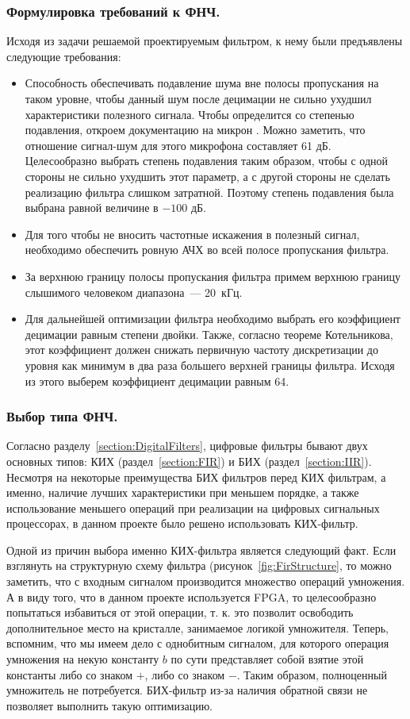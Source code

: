 \subsubsection{Формулировка требований к ФНЧ. }
Исходя из задачи решаемой проектируемым фильтром, к нему были предъявлены следующие требования:
\begin{itemize}
	\item Способность обеспечивать подавление шума вне полосы пропускания на таком уровне, чтобы данный шум после децимации не сильно ухудшил характеристики полезного сигнала. Чтобы определится со степенью подавления, откроем документацию на микрон \micname. Можно заметить, что отношение сигнал-шум для этого микрофона составляет 61 дБ. Целесообразно выбрать степень подавления таким образом, чтобы с одной стороны не сильно ухудшить этот параметр, а с другой стороны не сделать реализацию фильтра слишком затратной. Поэтому степень подавления была выбрана равной величине в $-100$ дБ.
	\item Для того чтобы не вносить частотные искажения в полезный сигнал, необходимо обеспечить ровную АЧХ во всей полосе пропускания фильтра.
	\item За верхнюю границу полосы пропускания фильтра примем верхнюю границу слышимого человеком диапазона~--- 20~кГц.
	\item Для дальнейшей оптимизации фильтра необходимо выбрать его коэффициент децимации равным степени двойки. Также, согласно теореме Котельникова, этот коэффициент должен снижать первичную частоту дискретизации до уровня как минимум в два раза большего верхней границы фильтра. Исходя из этого выберем коэффициент децимации равным 64.
\end{itemize}

\subsubsection{Выбор типа ФНЧ. }
Согласно разделу~\ref{section:DigitalFilters}, цифровые фильтры бывают двух основных типов: КИХ (раздел~\ref{section:FIR}) и БИХ (раздел~\ref{section:IIR}). Несмотря на некоторые преимущества БИХ фильтров перед КИХ фильтрам, а именно, наличие лучших характеристики при меньшем порядке, а также использование меньшего операций при реализации на цифровых сигнальных процессорах, в данном проекте было решено использовать КИХ-фильтр.

Одной из причин выбора именно КИХ-фильтра является следующий факт. Если взглянуть на структурную схему фильтра (рисунок~\ref{fig:FirStructure}, то можно заметить, что с входным сигналом производится множество операций умножения. А в виду того, что в данном проекте используется FPGA, то целесообразно попытаться избавиться от этой операции, т. к. это позволит освободить дополнительное место на кристалле, занимаемое логикой умножителя. Теперь, вспомним, что мы имеем дело с однобитным сигналом, для которого операция умножения на некую константу $b$ по сути представляет собой взятие этой константы либо со знаком $+$, либо со знаком $-$. Таким образом, полноценный умножитель не потребуется. БИХ-фильтр из-за наличия обратной связи не позволяет выполнить такую оптимизацию.

